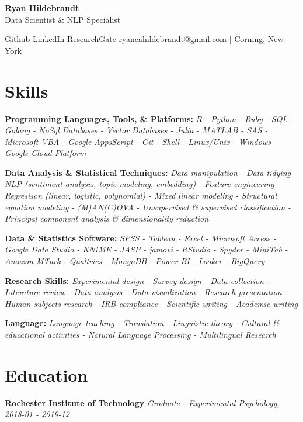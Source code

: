 \documentclass[a4paper,9pt]{extarticle}
\begin{document}
\begin{center}
\textbf{\Large Ryan Hildebrandt}\\[2pt]
Data Scientist \& NLP Specialist

\href{https://github.com/ryancahildebrandt}{Github} \href{https://linkedin.com/in/rcah}{LinkedIn} \href{https://researchgate.net/profile/Ryan-Hildebrandt}{ResearchGate}
ryancahildebrandt@gmail.com | Corning, New York
	\end{center}

\section*{Skills}

\noindent
\textbf{Programming Languages, Tools, \& Platforms:}
\textit{R - Python - Ruby - SQL - Golang - NoSql Databases - Vector Databases - Julia - MATLAB - SAS - Microsoft VBA - Google AppsScript - Git - Shell - Linux/Unix - Windows - Google Cloud Platform}

\noindent
\textbf{Data Analysis \& Statistical Techniques:}
\textit{Data manipulation - Data tidying - NLP (sentiment analysis, topic modeling, embedding) - Feature engineering - Regresison (linear, logistic, polynomial) - Mixed linear modeling - Structural equation modeling - (M)AN(C)OVA - Unsupervised \& supervised classification - Principal component analysis \& dimensionality reduction}

\noindent
\textbf{Data \& Statistics Software:}
\textit{SPSS - Tableau - Excel - Microsoft Access - Google Data Studio - KNIME - JASP - jamovi - RStudio - Spyder - MiniTab - Amazon MTurk - Qualtrics - MongoDB - Power BI - Looker - BigQuery}

\noindent
\textbf{Research Skills:}
\textit{Experimental design - Survey design - Data collection - Literature review - Data analysis - Data visualization - Research presentation - Human subjects research - IRB compliance - Scientific writing - Academic writing}

\noindent
\textbf{Language:}
\textit{Language teaching - Translation - Linguistic theory - Cultural \& educational activities - Natural Language Processing - Multilingual Research}

\section*{Education}

\noindent
\textbf{Rochester Institute of Technology}
\textit{Graduate - Experimental Psychology, 2018-01 - 2019-12}
\end{document}
